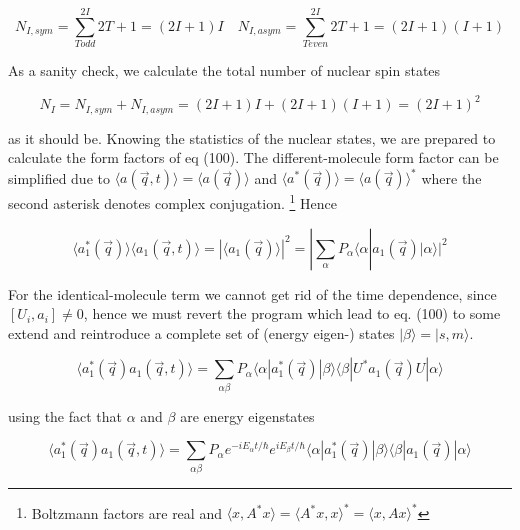 \documentclass[11pt,a4paper]{article}
\begin{document}
\begin{equation}
N_{I,sym} = \sum_{T odd}^{2I} 2T + 1 = (2I + 1)I    \quad
N_{I,asym} = \sum_{T even }^{2I}  2T + 1 =  (2I + 1)(I + 1)
\end{equation}

As a sanity check, we calculate the total number of nuclear spin states

\begin{equation}
N_{I} = N_{I,sym} + N_{I,asym}
= (2I + 1)I + (2I + 1)(I + 1)
= (2I + 1)^2
\end{equation}

as it should be. \newline
Knowing the statistics of the nuclear states, we are prepared to calculate the form factors of eq (100). The different-molecule form factor
can be simplified due to $\langle a(\vec q, t) \rangle = \langle a(\vec q) \rangle$ and $\langle a^*(\vec q) \rangle = \langle a(\vec q) \rangle ^*$
where the second asterisk denotes complex conjugation. 
\footnote{Boltzmann factors are real and $\langle x, A^* x \rangle = \langle A^* x ,x \rangle^* = \langle x , A x \rangle^*$}
Hence

\begin{equation}
\langle a_{1}^{*} (\vec q)  \rangle \langle a_{1} (\vec q, t) \rangle
=
| \langle a_{1} (\vec q) \rangle |^2
=
| \sum_{\alpha }  P_{\alpha} \langle \alpha | a_{1} (\vec q) | \alpha \rangle |^2
\end{equation}

For the identical-molecule term  we cannot get rid of the time dependence, since $[U_i, a_i] \ne 0$, hence we must revert the program which lead to eq. (100)
to some extend and reintroduce a complete set of (energy eigen-) states $|\beta \rangle = |s, m \rangle$.


\begin{equation}
\langle a_{1}^{*} (\vec q) a_1 (\vec q, t)\rangle
=
\sum_{\alpha \beta} P_{\alpha} 
\langle \alpha | a_{1}^{*} (\vec q)|\beta \rangle \langle \beta | U^* a_1 (\vec q) U |  \alpha \rangle
\end{equation}

using the fact that $\alpha$ and $\beta$ are energy eigenstates

\begin{equation}
\langle a_{1}^{*} (\vec q) a_1 (\vec q, t)\rangle
=
\sum_{\alpha \beta} P_{\alpha} e^{-i E_{\alpha}t/\hbar } e^{i E_{\beta} t/\hbar}
\langle \alpha | a_{1}^{*} (\vec q)|\beta \rangle \langle \beta | a_1 (\vec q) |  \alpha \rangle
\end{equation}
\end{document}
